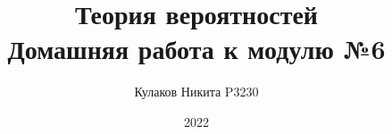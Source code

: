 
\title{Теория вероятностей\\ Домашняя работа к модулю №6}
\date{2022}
\author{Кулаков Никита P3230}



\maketitle

\begin{sloppypar}
\tableofcontents
\newpage


\end{sloppypar}


